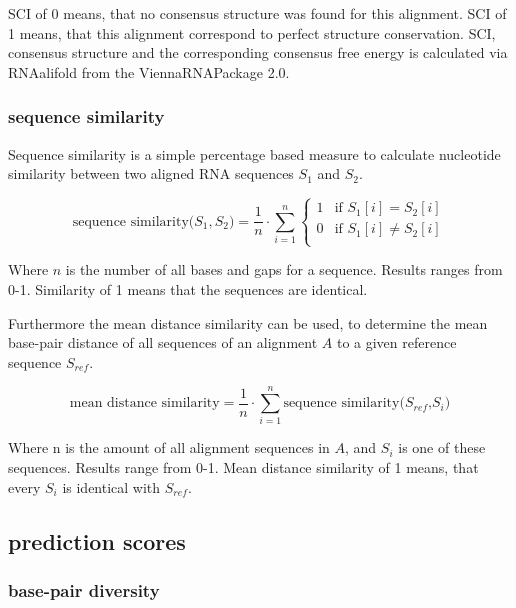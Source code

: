 \documentclass[ twoside,openright,titlepage,numbers=noenddot,headinclude,%
                footinclude=false, cleardoublepage=empty,abstractoff, %
                BCOR=5mm,paper=a4,fontsize=11pt,%
                ngerman,american,%
                ]{scrreprt}
\begin{document}
SCI of $0$ means, that no consensus structure was found for this alignment. SCI of 1 means, that this alignment correspond to perfect structure conservation. SCI, consensus structure and the corresponding consensus free energy is calculated via RNAalifold\cite{RNAalifold} from the ViennaRNAPackage 2.0\cite{ViennaRNA}.


\subsubsection{sequence similarity}
	

Sequence similarity is a simple percentage based measure to calculate nucleotide similarity
between two aligned RNA sequences $S_1$ and $S_2$.

\begin{equation}
\mbox{sequence similarity($S_1,S_2$)} = \frac{1}{n}\cdot \sum\limits^n_{i=1} \begin{cases} 
1 & \mbox{if } S_1[i]=S_2[i] \\
0 & \mbox{if } S_1[i]\not=S_2[i] \\ \end{cases}
\label{eq:sequence similarity score} 	
\end{equation}

Where $n$ is the number of all bases and gaps for a sequence.
Results ranges from 0-1. Similarity of 1 means that the sequences are identical. 

Furthermore the mean distance similarity can be used, to determine the mean base-pair distance of all sequences of an alignment $A$ to a given reference sequence $S_{ref}$. 
				 
\begin{equation}
 \mbox{mean distance similarity} =  \frac{1}{n}\cdot \sum\limits^n_{i=1} \mbox{sequence similarity($S_{ref}$,$S_i$)}
 \label{eq:sequence similarity average}	
\end{equation}

Where n is the amount of all alignment sequences in $A$, and $S_i$ is one of these sequences.
Results range from 0-1. Mean distance similarity of 1 means, that every $S_i$ is identical with $S_{ref}$.

\subsection{prediction scores} \label{section:prediction scores}

\subsubsection{base-pair diversity} 
\end{document}
